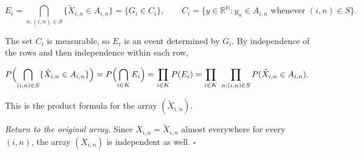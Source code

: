 \documentclass[11pt,a4paper]{article}
\begin{document}
\[E_i=\bigcap_{n:(i,n)\in S}\{\tilde X_{i,n}\in A_{i,n}\}=\{G_i\in C_i\},\qquad C_i=\{y\in\mathbb R^{\mathbb N}:y_n\in A_{i,n}\text{ whenever }(i,n)\in S\}.\]


The set \(C_i\) is measurable, so \(E_i\) is an event determined by \(G_i\). By independence of the rows and then independence within each row,


\[P\Bigl(\bigcap_{(i,n)\in S}\{\tilde X_{i,n}\in A_{i,n}\}\Bigr)=P\Bigl(\bigcap_{i\in K}E_i\Bigr)=\prod_{i\in K}P(E_i)=\prod_{i\in K}\ \prod_{n:(i,n)\in S}P(\tilde X_{i,n}\in A_{i,n}).\]


This is the product formula for the array \((\tilde X_{i,n})\).




\emph{Return to the original array.} Since \(X_{i,n}=\tilde X_{i,n}\) almost everywhere for every \((i,n)\), the array \((X_{i,n})\) is independent as well. \(\square\)
\end{document}
